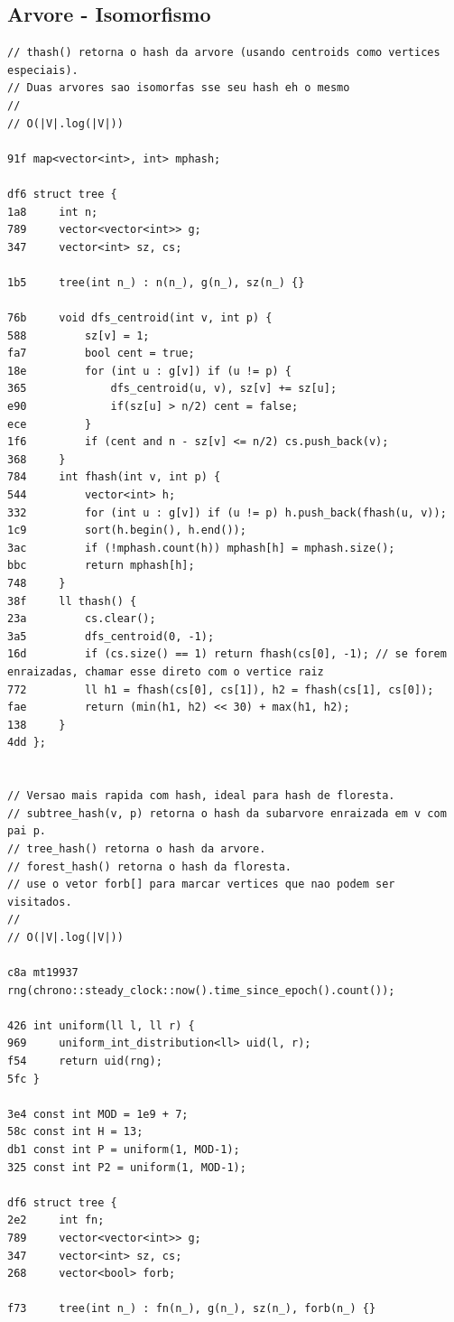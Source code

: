 \documentclass[11pt, a4paper, twoside]{article}
\begin{document}
\subsection{Arvore - Isomorfismo}
\begin{lstlisting}
// thash() retorna o hash da arvore (usando centroids como vertices especiais).
// Duas arvores sao isomorfas sse seu hash eh o mesmo
//
// O(|V|.log(|V|))

91f map<vector<int>, int> mphash;

df6 struct tree {
1a8 	int n;
789 	vector<vector<int>> g;
347 	vector<int> sz, cs;
    
1b5 	tree(int n_) : n(n_), g(n_), sz(n_) {}
    
76b 	void dfs_centroid(int v, int p) {
588 		sz[v] = 1;
fa7 		bool cent = true;
18e 		for (int u : g[v]) if (u != p) {
365 			dfs_centroid(u, v), sz[v] += sz[u];
e90 			if(sz[u] > n/2) cent = false;
ece 		}
1f6 		if (cent and n - sz[v] <= n/2) cs.push_back(v);
368 	}
784 	int fhash(int v, int p) {
544 		vector<int> h;
332 		for (int u : g[v]) if (u != p) h.push_back(fhash(u, v));
1c9 		sort(h.begin(), h.end());
3ac 		if (!mphash.count(h)) mphash[h] = mphash.size();
bbc 		return mphash[h];
748 	}
38f 	ll thash() {
23a 		cs.clear();
3a5 		dfs_centroid(0, -1);
16d 		if (cs.size() == 1) return fhash(cs[0], -1); // se forem enraizadas, chamar esse direto com o vertice raiz
772 		ll h1 = fhash(cs[0], cs[1]), h2 = fhash(cs[1], cs[0]);
fae 		return (min(h1, h2) << 30) + max(h1, h2);
138 	}
4dd };


// Versao mais rapida com hash, ideal para hash de floresta.
// subtree_hash(v, p) retorna o hash da subarvore enraizada em v com pai p.
// tree_hash() retorna o hash da arvore.
// forest_hash() retorna o hash da floresta.
// use o vetor forb[] para marcar vertices que nao podem ser visitados.
//
// O(|V|.log(|V|))

c8a mt19937 rng(chrono::steady_clock::now().time_since_epoch().count());

426 int uniform(ll l, ll r) {
969 	uniform_int_distribution<ll> uid(l, r);
f54 	return uid(rng);
5fc }

3e4 const int MOD = 1e9 + 7;
58c const int H = 13;
db1 const int P = uniform(1, MOD-1);
325 const int P2 = uniform(1, MOD-1);

df6 struct tree {
2e2 	int fn;
789 	vector<vector<int>> g;
347 	vector<int> sz, cs;
268 	vector<bool> forb;
    
f73 	tree(int n_) : fn(n_), g(n_), sz(n_), forb(n_) {}
    

\end{lstlisting}
\end{document}

